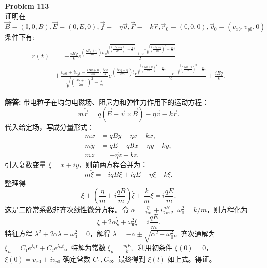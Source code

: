 \documentclass[12pt, a4paper, oneside]{ctexart}
\newenvironment{solution}{\par\noindent\textbf{解答:}\quad}{\par}
\begin{document}
\begin{mdframed}[backgroundcolor=gray!10, linewidth=0pt]
    \textbf{Problem 113} \\
    证明在 $\vec{B}=(0,0,B),\vec{E}=(0,E,0),\vec{f}=-\eta\vec{v},\vec{F}=-k\vec{r},\vec{r}_0=(0,0,0),\vec{v}_0=(v_{x0},v_{y0},0)$ 条件下有:
    \[
    \begin{aligned}
        \bar{r}(t) &= -\frac{iEq}{k} e^{\left(\frac{iBq+\eta}{2m}\right)t} \frac{e^{\sqrt{\left(\frac{iBq+\eta}{2m}\right)^2-\frac{k}{m}t}} + e^{-\sqrt{\left(\frac{iBq+\eta}{2m}\right)^2-\frac{k}{m}t}}}{2} \\
        &+ \frac{v_{x0}+iv_{y0}-\frac{iBq+\eta}{2m}\cdot\frac{iEq}{k}}{\sqrt{\left(\frac{iBq+\eta}{2m}\right)^2-\frac{k}{m}}} e^{\left(\frac{iBq+\eta}{2m}\right)t} \frac{e^{\sqrt{\left(\frac{iBq+\eta}{2m}\right)^2-\frac{k}{m}t}} - e^{-\sqrt{\left(\frac{iBq+\eta}{2m}\right)^2-\frac{k}{m}t}}}{2} + \frac{iEq}{k}.
    \end{aligned}
    \]
\end{mdframed}
\begin{solution}
    带电粒子在均匀电磁场、阻尼力和弹性力作用下的运动方程：
    \[
    m \ddot{\vec{r}} = q(\vec{E} + \vec{v} \times \vec{B}) - \eta \vec{v} - k \vec{r}.
    \]
    代入给定场，写成分量形式：
    \[
    \begin{aligned}
        m \ddot{x} &= q B \dot{y} - \eta \dot{x} - k x, \\
        m \ddot{y} &= q E - q B \dot{x} - \eta \dot{y} - k y, \\
        m \ddot{z} &= -\eta \dot{z} - k z.
    \end{aligned}
    \]
    引入复数变量 $\xi = x + i y$，则前两方程合并为：
    \[
    m \ddot{\xi} = -i q B \dot{\xi} + i q E - \eta \dot{\xi} - k \xi.
    \]
    整理得
    \[
    \ddot{\xi} + \left( \frac{\eta}{m} + i \frac{q B}{m} \right) \dot{\xi} + \frac{k}{m} \xi = i \frac{q E}{m}.
    \]
    这是二阶常系数非齐次线性微分方程。令 $\alpha = \frac{\eta}{2m} + i \frac{q B}{2m}$，$\omega_0^2 = k/m$，则方程化为
    \[
    \ddot{\xi} + 2\alpha \dot{\xi} + \omega_0^2 \xi = i \frac{q E}{m}.
    \]
    特征方程 $\lambda^2 + 2\alpha \lambda + \omega_0^2 = 0$，解得 $\lambda = -\alpha \pm \sqrt{\alpha^2 - \omega_0^2}$。齐次通解为 $\xi_h = C_1 e^{\lambda_1 t} + C_2 e^{\lambda_2 t}$。特解为常数 $\xi_p = \frac{i q E}{k}$。利用初条件 $\xi(0)=0$，$\dot{\xi}(0)=v_{x0}+i v_{y0}$ 确定常数 $C_1, C_2$。最终得到 $\xi(t)$ 如上式。得证。
\end{solution}
\end{document}
